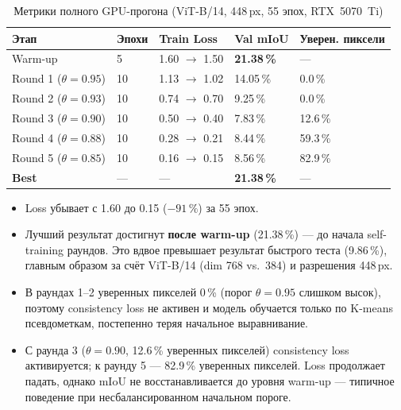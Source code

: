 \documentclass[11pt,a4paper]{article}
\begin{document}
\begin{table}[htbp]
\centering
\caption{Метрики полного GPU-прогона (ViT-B/14, 448\,px, 55 эпох, RTX~5070~Ti)}
\label{tab:results}
\small
{}
\begin{tabularx}{0.96\textwidth}{L{3.4cm} C{1.5cm} C{2.2cm} C{2.8cm} C{2.5cm}}
  \toprule
  \textbf{Этап} & \textbf{Эпохи} & \textbf{Train Loss} & \textbf{Val mIoU} & \textbf{Уверен. пиксели} \\
  \midrule
  Warm-up       & 5  & 1.60 $\to$ 1.50 & \textbf{21.38\,\%} & --- \\
  Round 1 ($\theta{=}0.95$) & 10 & 1.13 $\to$ 1.02 & 14.05\,\% & 0.0\,\% \\
  Round 2 ($\theta{=}0.93$) & 10 & 0.74 $\to$ 0.70 & 9.25\,\%  & 0.0\,\% \\
  Round 3 ($\theta{=}0.90$) & 10 & 0.50 $\to$ 0.40 & 7.83\,\%  & 12.6\,\% \\
  Round 4 ($\theta{=}0.88$) & 10 & 0.28 $\to$ 0.21 & 8.44\,\%  & 59.3\,\% \\
  Round 5 ($\theta{=}0.85$) & 10 & 0.16 $\to$ 0.15 & 8.56\,\%  & 82.9\,\% \\
  \midrule
  \textbf{Best} & --- & --- & \textbf{21.38\,\%} & --- \\
  \bottomrule
\end{tabularx}
\end{table}

\begin{resultbox}
  \begin{itemize}
    \item Loss убывает с 1.60 до 0.15 ($-91\,\%$) за 55 эпох.
    \item Лучший результат достигнут \textbf{после warm-up} (21.38\,\%) ---
          до начала self-training раундов. Это вдвое превышает результат
          быстрого теста (9.86\,\%), главным образом за счёт ViT-B/14
          (dim 768 vs.\ 384) и разрешения 448\,px.
    \item В раундах 1--2 уверенных пикселей 0\,\% (порог $\theta{=}0.95$
          слишком высок), поэтому consistency loss не активен и модель
          обучается только по K-means псевдометкам, постепенно теряя
          начальное выравнивание.
    \item С раунда 3 ($\theta{=}0.90$, 12.6\,\% уверенных пикселей)
          consistency loss активируется; к раунду 5 --- 82.9\,\% уверенных
          пикселей. Loss продолжает падать, однако mIoU не восстанавливается
          до уровня warm-up --- типичное поведение при несбалансированном
          начальном пороге.
  \end{itemize}
\end{resultbox}
\end{document}
